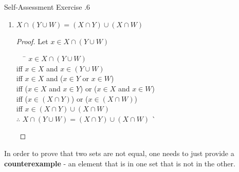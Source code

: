 \documentclass[../notes.tex]{subfiles}
\begin{document}
\begin{exercise}{Self-Assessment Exercise \thechapter.6}
\begin{enumerate}[label=(\alph*), itemsep=0.5em]
\begin{proof}
\begin{tabbing}
								$\therefore$ \> $X \cap (Y \cap W) = (X \cap Y) \cap W$ \` \qedhere
							\end{tabbing}
						\end{proof}
					\item $X \cap (Y \cup W) = (X \cap Y) \cup (X \cap W)$
						\begin{proof}
							Let $x \in X \cap (Y \cup W)$
							\begin{tabbing}
								$\quad$ \= $x \in X \cap (Y \cup W)$\\
								iff \> $x \in X$ and $x \in (Y \cup W)$\\
								iff \> $x \in X$ and ($x \in Y$ or $x \in W$)\\
								iff \> ($x \in X$ and $x \in Y$) or ($x \in X$ and $x \in W$)\\
								iff \> ($x \in (X \cap Y)$) or ($x \in (X \cap W)$)\\
								iff \> $x \in (X \cap Y) \cup (X \cap W)$\\
								$\therefore$ \> $X \cap (Y \cup W) = (X \cap Y) \cup (X \cap W)$ \` \qedhere
							\end{tabbing}
						\end{proof}
				\end{enumerate}
			\end{exercise}
			In order to prove that two sets are not equal, one needs to just provide a \textbf{counterexample} - an element that is in one set that is not in the other.
\end{document}
